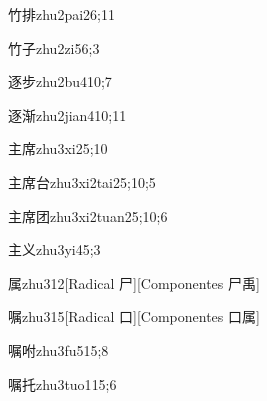\begin{verbete}{竹排}{zhu2pai2}{6;11}
\end{verbete}

\begin{verbete}{竹子}{zhu2zi5}{6;3}
\end{verbete}

\begin{verbete}{逐步}{zhu2bu4}{10;7}
\end{verbete}

\begin{verbete}{逐渐}{zhu2jian4}{10;11}
\end{verbete}

\begin{verbete}{主席}{zhu3xi2}{5;10}
\end{verbete}

\begin{verbete}{主席台}{zhu3xi2tai2}{5;10;5}
\end{verbete}

\begin{verbete}{主席团}{zhu3xi2tuan2}{5;10;6}
\end{verbete}

\begin{verbete}{主义}{zhu3yi4}{5;3}
\end{verbete}

\begin{verbete}{属}{zhu3}{12}[Radical 尸][Componentes 尸禹]
\end{verbete}

\begin{verbete}{嘱}{zhu3}{15}[Radical 口][Componentes 口属]
\end{verbete}

\begin{verbete}{嘱咐}{zhu3fu5}{15;8}
\end{verbete}

\begin{verbete}{嘱托}{zhu3tuo1}{15;6}
\end{verbete}

